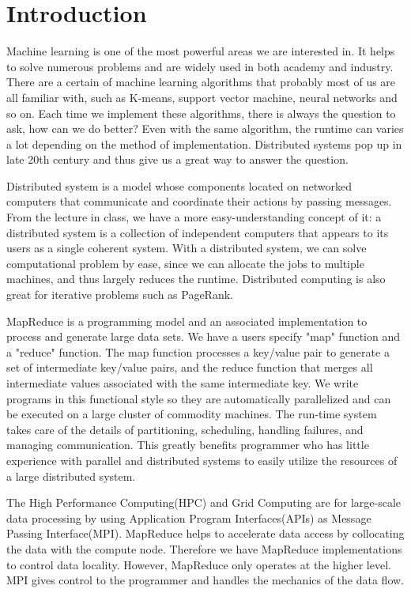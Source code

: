 \section{Introduction}
Machine learning is one of the most powerful areas we are interested in. It helps to solve numerous problems and are widely used in both academy and industry. There are a certain of machine learning algorithms that probably most of us are all familiar with, such as K-means, support vector machine\cite{suykens1999least}, neural networks\cite{haykin2004comprehensive} and so on. Each time we implement these algorithms, there is always the question to ask, how can we do better? Even with the same algorithm, the runtime can varies a lot depending on the method of implementation. Distributed systems\cite{tanenbaum2007distributed} pop up in late 20th century and thus give us a great way to answer the question.

Distributed system is a model whose components located on networked computers that communicate and coordinate their actions by passing messages. From the lecture in class, we have a more easy-understanding concept of it: a distributed system is a collection of independent computers that appears to its users as a single coherent system. With a distributed system, we can solve computational problem by ease, since we can allocate the jobs to multiple machines, and thus largely reduces the runtime. Distributed computing is also great for iterative problems such as PageRank\cite{page1999pagerank}. 

MapReduce\cite{dean2008mapreduce} is a programming model and an associated implementation to process and generate large data sets. We have a users specify "map" function and a "reduce" function. The map function processes a key/value pair to generate a set of intermediate key/value pairs, and the reduce function that merges all intermediate values associated with the same intermediate key. We write programs in this functional style so they are automatically parallelized and can be executed on a large cluster of commodity machines. The run-time system takes care of the details of partitioning, scheduling, handling failures, and managing communication. This greatly benefits programmer who has little experience with parallel and distributed systems to easily utilize the resources of a large distributed system.

The High Performance Computing(HPC)\cite{dowd1993high} and Grid Computing\cite{foster2003grid} are for large-scale data processing by using Application Program Interfaces(APIs) as Message Passing Interface(MPI)\cite{gropp1996high}. MapReduce helps to accelerate data access by collocating the data with the compute node. Therefore we have MapReduce implementations to control data locality. However, MapReduce only operates at the higher level. MPI gives control to the programmer and handles the mechanics of the data flow.

